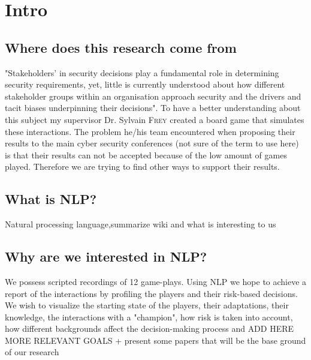 \documentclass[9pt]{article}
\begin{document}
\section{Intro}
\subsection{Where does this research come from}
"Stakeholders’ in security decisions play a fundamental role in determining security requirements, yet, little is currently understood about how different stakeholder groups within an organisation approach security and the drivers and tacit biases underpinning their decisions"\cite{DnD}. To have a better understanding about this subject my supervisor Dr. Sylvain \textsc{Frey} created a board game that simulates these interactions. 
The problem he/his team encountered when proposing their results to the main cyber security conferences (not sure of the term to use here) is that their results can not be accepted because of the low amount of games played. 
Therefore we are trying to find other ways to support their results.
\subsection{What is NLP?}
Natural processing language,{summarize wiki and what is interesting to us} 

\subsection{Why are we interested in NLP?}
We possess scripted recordings of 12 game-plays. Using NLP we hope to achieve a report of the interactions by profiling the players and their risk-based decisions. We wish to visualize the starting state of the players, their adaptations, their knowledge, the interactions with a "champion", how risk is taken into account, how different backgrounds affect the decision-making process and {ADD HERE MORE RELEVANT GOALS}
+ {present some papers that will be the base ground of our research}
\end{document}
